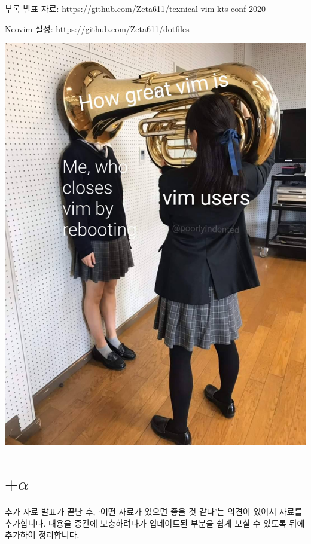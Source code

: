 \documentclass{beamer}
\begin{document}
\begin{frame}{부록}
  발표 자료: \url{https://github.com/Zeta611/texnical-vim-kts-conf-2020}

  Neovim 설정: \url{https://github.com/Zeta611/dotfiles}

  \centering\includegraphics[width=0.35\linewidth]{figures/how-great-vim-is}
\end{frame}

\section{\texorpdfstring{$+\alpha$}{+⍺}}
\begin{frame}{추가 자료}
  발표가 끝난 후, `어떤 자료가 있으면 좋을 것 같다'는 의견이 있어서 자료를
  추가합니다.
  내용을 중간에 보충하려다가 업데이트된 부분을 쉽게 보실 수 있도록 뒤에
  추가하여 정리합니다.
\end{frame}
\end{document}
